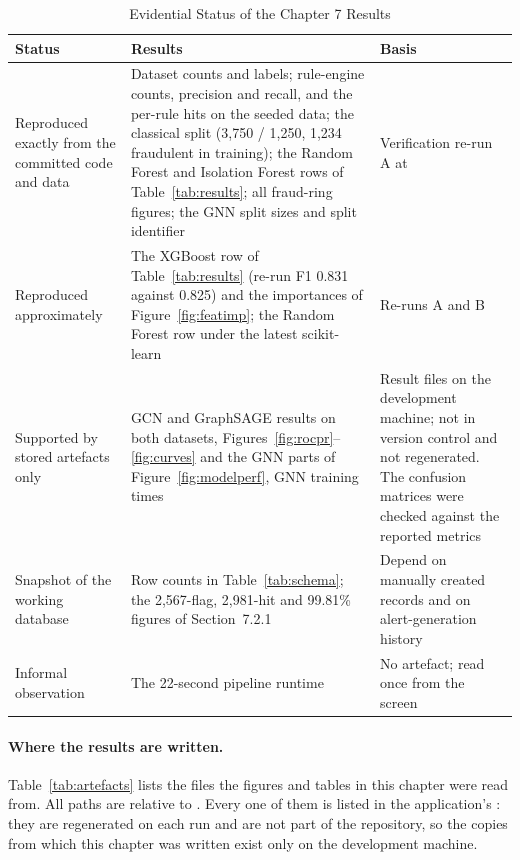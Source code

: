 \begin{table}[htbp]
\centering
\caption{Evidential Status of the Chapter 7 Results}
\label{tab:evidence}
\footnotesize
\begin{tabularx}{\textwidth}{@{}L{3.2cm}YL{3.4cm}@{}}
\toprule
\textbf{Status} & \textbf{Results} & \textbf{Basis} \\
\midrule
Reproduced exactly from the committed code and data & Dataset counts and labels; rule-engine counts, precision and recall, and the per-rule hits on the seeded data; the classical split (3,750 / 1,250, 1,234 fraudulent in training); the Random Forest and Isolation Forest rows of Table~\ref{tab:results}; all fraud-ring figures; the GNN split sizes and split identifier & Verification re-run A at  \\
\addlinespace
Reproduced approximately & The XGBoost row of Table~\ref{tab:results} (re-run F1 0.831 against 0.825) and the importances of Figure~\ref{fig:featimp}; the Random Forest row under the latest scikit-learn & Re-runs A and B \\
\addlinespace
Supported by stored artefacts only & GCN and GraphSAGE results on both datasets, Figures~\ref{fig:rocpr}--\ref{fig:curves} and the GNN parts of Figure~\ref{fig:modelperf}, GNN training times & Result files on the development machine; not in version control and not regenerated. The confusion matrices were checked against the reported metrics \\
\addlinespace
Snapshot of the working database & Row counts in Table~\ref{tab:schema}; the 2,567-flag, 2,981-hit and 99.81\% figures of Section~7.2.1 & Depend on manually created records and on alert-generation history \\
\addlinespace
Informal observation & The 22-second pipeline runtime & No artefact; read once from the screen \\
\bottomrule
\end{tabularx}
\end{table}

\paragraph{Where the results are written.} Table~\ref{tab:artefacts} lists the files the figures and tables in this chapter were read from. All paths are relative to . Every one of them is listed in the application's : they are regenerated on each run and are not part of the repository, so the copies from which this chapter was written exist only on the development machine.

